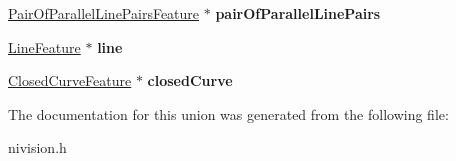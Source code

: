 \begin{DoxyCompactItemize}
\item 
\hypertarget{unionGeometricFeature__union_a45647053f785b11ee2d8ff08701ed631}{\hyperlink{structPairOfParallelLinePairsFeature__struct}{\-Pair\-Of\-Parallel\-Line\-Pairs\-Feature} $\ast$ {\bfseries pair\-Of\-Parallel\-Line\-Pairs}}\label{unionGeometricFeature__union_a45647053f785b11ee2d8ff08701ed631}

\item 
\hypertarget{unionGeometricFeature__union_aefb3f0d2e81ad94410aaf339b4564249}{\hyperlink{structLineFeature__struct}{\-Line\-Feature} $\ast$ {\bfseries line}}\label{unionGeometricFeature__union_aefb3f0d2e81ad94410aaf339b4564249}

\item 
\hypertarget{unionGeometricFeature__union_a1d50598487d3ad4a33bf1bde4766628b}{\hyperlink{structClosedCurveFeature__struct}{\-Closed\-Curve\-Feature} $\ast$ {\bfseries closed\-Curve}}\label{unionGeometricFeature__union_a1d50598487d3ad4a33bf1bde4766628b}

\end{DoxyCompactItemize}


\-The documentation for this union was generated from the following file\-:\begin{DoxyCompactItemize}
\item 
nivision.\-h\end{DoxyCompactItemize}
